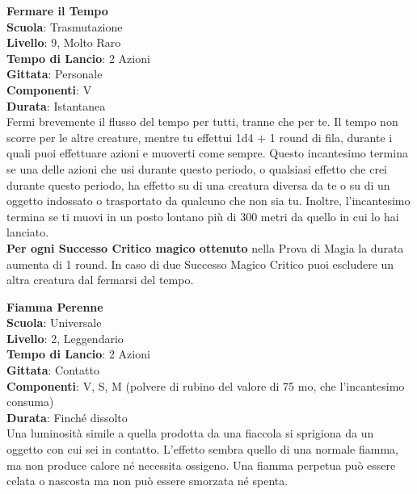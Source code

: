 \begin{multicols}{2}
\medskip\textbf{Fermare il Tempo}\\
\textbf{Scuola}: Trasmutazione\\
\textbf{Livello}: 9, Molto Raro\\
\textbf{Tempo di Lancio}: 2 Azioni\\
\textbf{Gittata}: Personale\\
\textbf{Componenti}: V\\
\textbf{Durata}: Istantanea\\
Fermi brevemente il flusso del tempo per tutti, tranne che per te. Il tempo non scorre per le altre creature, mentre tu effettui 1d4 + 1 round di fila, durante i quali puoi effettuare azioni e muoverti come sempre. Questo incantesimo termina se una delle azioni che usi durante questo periodo, o qualsiasi effetto che crei durante questo periodo, ha effetto su di una creatura diversa da te o su di un oggetto indossato o trasportato da qualcuno che non sia tu. Inoltre, l'incantesimo termina se ti muovi in un posto lontano più di 300 metri da quello in cui lo hai lanciato.\\
\textbf{Per ogni Successo Critico magico ottenuto} nella Prova di Magia la durata aumenta di 1 round. In caso di due Successo Magico Critico puoi escludere un altra creatura dal fermarsi del tempo.

\medskip\textbf{Fiamma Perenne}\\
\textbf{Scuola}: Universale\\
\textbf{Livello}: 2, Leggendario\\
\textbf{Tempo di Lancio}: 2 Azioni\\
\textbf{Gittata}: Contatto\\
\textbf{Componenti}: V, S, M (polvere di rubino del valore di 75 mo, che l'incantesimo consuma)\\
\textbf{Durata}: Finché dissolto\\
Una luminosità simile a quella prodotta da una fiaccola si sprigiona da un oggetto con cui sei in contatto. L'effetto sembra quello di una normale fiamma, ma non produce calore né necessita ossigeno. Una fiamma perpetua può essere celata o nascosta ma non può essere smorzata né spenta.


\end{multicols}
